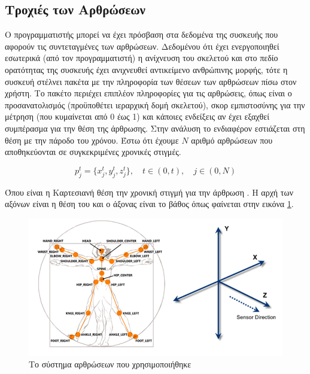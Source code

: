 \subsection{Τροχιές των Αρθρώσεων}

Ο προγραμματιστής  μπορεί να έχει πρόσβαση στα δεδομένα της συσκευής που αφορούν τις συντεταγμένες των αρθρώσεων. Δεδομένου ότι έχει ενεργοποιηθεί εσωτερικά (από τον προγραμματιστή) η ανίχνευση του σκελετού και στο πεδίο ορατότητας της συσκευής έχει ανιχνευθεί αντικείμενο ανθρώπινης μορφής, τότε η συσκευή στέλνει πακέτα με την πληροφορία των θέσεων των αρθρώσεων πίσω στον χρήστη. Το πακέτο περιέχει επιπλέον πληροφορίες για τις αρθρώσεις, όπως είναι ο προσανατολισμός (προϋποθέτει ιεραρχική δομή σκελετού), σκορ εμπιστοσύνης για την μέτρηση (που κυμαίνεται από 0 έως 1) και κάποιες ενδείξεις αν έχει εξαχθεί συμπέρασμα για την θέση της άρθρωσης. Στην ανάλυση το ενδιαφέρον εστιάζεται στη θέση με την πάροδο του χρόνου. Έστω ότι έχουμε $Ν$ αριθμό αρθρώσεων που αποθηκεύονται σε συγκεκριμένες χρονικές στιγμές.

\begin{equation}
    p^{t}_{j} = \{x^{t}_{j}, y^{t}_{j}, z^{t}_{j}\}, \quad t \in (0, t), \quad j \in (0, N)
    \label{equ:trajectories}
\end{equation}

Όπου  είναι η Καρτεσιανή θέση την χρονική στιγμή  για την άρθρωση . Η αρχή των αξόνων είναι η θέση του  και ο άξονας  είναι το βάθος όπως φαίνεται στην εικόνα \ref{fig:kinect-joints}.

\begin{figure}[H]
    \centering
    \includegraphics[width=.9\textwidth, keepaspectratio]{fig/kinect-joints.png}
    \caption{Το σύστημα αρθρώσεων που χρησιμοποιήθηκε\protect\footnotemark}
    \label{fig:kinect-joints}
\end{figure}

